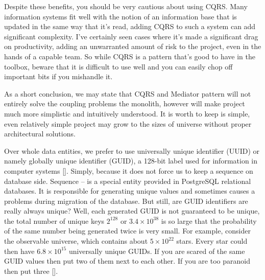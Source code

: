 Despite these benefits, you should be very cautious about using CQRS\@.
Many information systems fit well with the notion of an information base that is updated in the same way that it's read,
adding CQRS to such a system can add significant complexity.
I've certainly seen cases where it's made a significant drag on productivity, adding an unwarranted amount of risk to the
project, even in the hands of a capable team.
So while CQRS is a pattern that's good to have in the toolbox, beware that it is difficult to use well and you can easily
chop off important bits if you mishandle it.

As a short conclusion, we may state that CQRS and Mediator pattern will not entirely solve the coupling problems the monolith,
however will make project much more simplistic and intuitively understood.
It is worth to keep is simple,
even relatively simple project may grow to the sizes of universe without proper architectural solutions.

Over whole data entities, we prefer to use universally unique identifier (UUID) or namely globally unique identifier (GUID),
a 128-bit label used for information in computer systems [\cite{leach2005universally}].
Simply, because it does not force us to keep a sequence on database side.
Sequence -- is a special entity provided in PostgreSQL relational databases.
It is responsible for generating unique values and sometimes causes a problems during migration of the database.
But still, are GUID identifiers are really always unique?
Well, each generated GUID is not guaranteed to be unique, the total number of unique keys $2^{128}$ or $3.4 \times 10^{38}$
is so large that the probability of the same number being generated twice is very small.
For example, consider the observable universe, which contains about $5 \times 10^{22}$ stars.
Every star could then have $6.8 \times 10^{15}$ universally unique GUIDs.
If you are scared of the same GUID values then put two of them next to each other.
If you are too paranoid then put three [\cite{GUIDSo}].